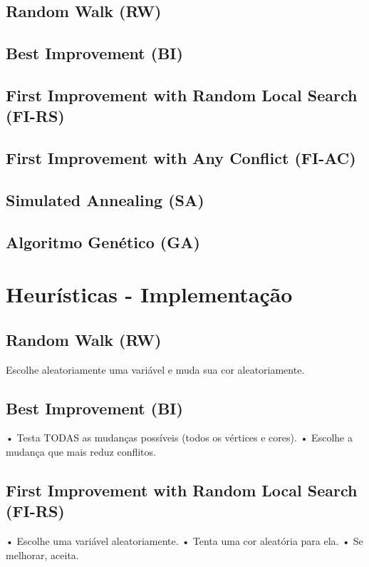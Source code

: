 \documentclass[12pt,a4paper]{article}
\begin{document}
\subsection{Random Walk (RW)}

\subsection{Best Improvement (BI)}

\subsection{First Improvement with Random Local Search (FI-RS)}

\subsection{First Improvement with Any Conflict (FI-AC)}

\subsection{Simulated Annealing (SA)}

\subsection{Algoritmo Genético (GA)}


\section{Heurísticas - Implementação}
\subsection{Random Walk (RW)}
Escolhe aleatoriamente uma variável e muda sua cor aleatoriamente.

\subsection{Best Improvement (BI)}
• Testa TODAS as mudanças possíveis (todos os vértices e cores).
• Escolhe a mudança que mais reduz conflitos.

\subsection{First Improvement with Random Local Search (FI-RS)}
• Escolhe uma variável aleatoriamente.
• Tenta uma cor aleatória para ela.
• Se melhorar, aceita.
\end{document}
